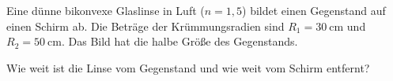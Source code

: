 \begin{ExerciseBlock}
Eine dünne bikonvexe Glaslinse in Luft ($n=1{,}5$) bildet einen Gegenstand auf einen Schirm ab. Die Beträge der Krümmungsradien sind $R_1=\qty{30}{\centi\metre}$ und $R_2=\qty{50}{\centi\metre}$. Das Bild hat die halbe Größe des Gegenstands.

Wie weit ist die Linse vom Gegenstand und wie weit vom Schirm entfernt?
\end{ExerciseBlock}
